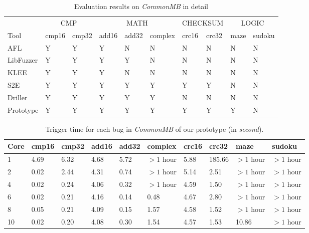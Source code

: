 \begin{table}
  \caption{\label{CommonMB-results-detail}Evaluation results on \textit{CommonMB} in detail}
  \centering
	\begin{tabular}{p{2cm}<{\centering} p{1cm}<{\centering} p{1cm}<{\centering} | p{1cm}<{\centering}
	p{1cm}<{\centering} p{1.2cm}<{\centering} | p{1cm}<{\centering} p{1cm}<{\centering} | p{1cm}<{\centering} p{1cm}<{\centering}}
		\toprule
	& \multicolumn{2}{c}{CMP}  & \multicolumn{3}{c}{MATH} & \multicolumn{2}{c}{CHECKSUM} & 	\multicolumn{2}{c}{LOGIC} \\ 
	    Tool & cmp16 & cmp32 & add16 & add32 & complex & crc16 & crc32 & maze & sudoku \\
		\midrule
		AFL 		& Y & Y & Y & N & N & N & N & N & N \\
		LibFuzzer	& Y & Y & Y & Y & N & N & N & N & N \\
		KLEE		& Y & Y & Y & N & N & N & N & N & N \\
		S2E			& Y & Y & Y & Y & Y & Y & Y & N & N \\
		Driller		& Y & Y & Y & Y & Y & N & N & N & N \\
		Prototype	& Y & Y & Y & Y & Y & Y & Y & Y & N \\
	 \bottomrule
	\end{tabular}
\end{table}
\begin{table}
\centering
  \caption{\label{Prototype-result-CommonMB}Trigger time for each bug in \textit{CommonMB}  of our prototype (in \textit{second}).}
 	\begin{tabular}{p{0.5cm}<{\centering} p{1cm}<{\centering} p{1cm}<{\centering} p{1cm}<{\centering}	p{1cm}<{\centering} p{1.5cm}<{\centering}  p{1cm}<{\centering} p{1cm}<{\centering}  p{1.5cm}<{\centering} p{1.5cm}<{\centering}}
		\toprule
	    Core & cmp16 & cmp32 & add16 & add32 & complex & crc16 & crc32 & maze & sudoku \\
		\midrule
		1 	& 4.69 & 6.32 & 4.68 & 5.72 & $>1$ hour & 5.88 & 185.66 & $>1$ hour & $>1$ hour \\
		2	& 0.02 & 2.44 & 4.31 & 0.74 & $>1$ hour & 5.14 & 2.51   & $>1$ hour & $>1$ hour \\
		4	& 0.02 & 0.24 & 4.06 & 0.32 & $>1$ hour & 4.59 & 1.50   & $>1$ hour & $>1$ hour \\
		6	& 0.02 & 0.21 & 4.16 & 0.14 & 0.48 	    & 4.67 & 2.80   & $>1$ hour & $>1$ hour \\
		8	& 0.05 & 0.21 & 4.09 & 0.15 & 1.57      & 4.58 & 1.52   & $>1$ hour & $>1$ hour \\
		10	& 0.02 & 0.20 & 4.08 & 0.30 & 1.54      & 4.57 & 1.53   & 10.86     & $>1$ hour \\
	 \bottomrule
	\end{tabular}
\end{table}

